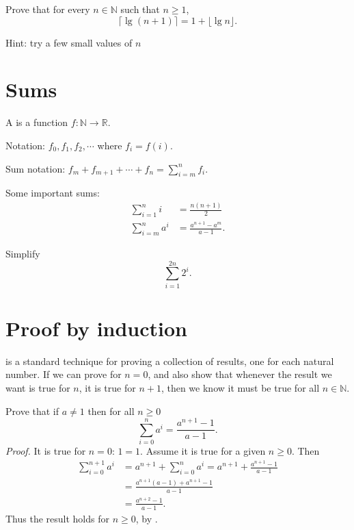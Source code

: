 \begin{Boxample}
Prove that for every $n\in \mathbb{N}$ such that $n\geq 1$,
$$ \lceil \lg (n+1) \rceil = 1 + \lfloor \lg n \rfloor\text{.}$$
\par\vspace*{4cm}\hfill\footnotesize Hint: try a few small values of $n$
\end{Boxample}


\section{Sums}
A  is a function $f \colon \mathbb{N} \to \mathbb{R}$. 

Notation: $f_0, f_1, f_2, \cdots$ where $f_i = f(i)$.

Sum notation: $f_m+f_{m+1}+\cdots +f_n = \sum_{i=m}^n f_i$.

Some important sums: 
\begin{align*}
	\sum_{i=1}^n i & = \frac{n(n + 1)}{2} \\
	\sum_{i=m}^n a^i&  = \frac{a^{n+1} - a^m}{a - 1}.
\end{align*}

\begin{Boxample}[4]
Simplify $$\sum_{i=1}^{2n} 2^i\text{.}$$
\end{Boxample}


\section{Proof by induction}
 is a standard technique for proving a collection of results, one for each natural number. 
If we can prove for $n = 0$, and also show that whenever the result we want is true for $n$, it is true for $n+1$,
then we know it must be true for all $n \in \mathbb{N}$.

\begin{Boxample}
Prove that if $a\neq 1$ then for all  $n\geq 0$
$$
	\sum_{i=0}^n a^i = \frac{a^{n+1} - 1}{a - 1}.
$$
\textit{Proof.} It is true for $n=0$: $1 = 1$. Assume it is true for a given  $n\geq 0$. Then
\begin{align*}
\sum_{i=0}^{n+1} a^i 
	& = a^{n+1} + \sum_{i=0}^n a^i = a^{n+1} + \frac{a^{n+1} - 1}{a - 1} \\
	& = \frac{a^{n+1} (a - 1) + a^{n+1} - 1}{a - 1}\\
	& = \frac{a^{n+2} - 1}{a - 1}.
\end{align*}
Thus the result holds for  $n \geq 0$, by .
\end{Boxample}

